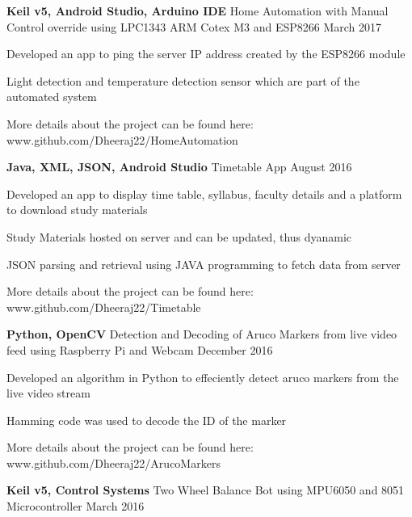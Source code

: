 \begin{cventries}
  \cventry
    {\textbf{Keil v5, Android Studio, Arduino IDE}}
    {Home Automation with Manual Control override using LPC1343 ARM Cotex M3 and ESP8266}
   {}
    {March 2017}
    {
      \begin{cvitems}
        \item {Developed an app to ping the server IP address created by the ESP8266 module}
         \item {Light detection and temperature detection sensor which are part of the automated system}
         \item {More details about the project can be found here: \textcolor{awesome-emerald}{www.github.com/Dheeraj22/HomeAutomation}}
      \end{cvitems}
    }
     \cventry
    {\textbf{Java, XML, JSON, Android Studio}}
    {Timetable App}
    {}
    {August 2016}
    {
      \begin{cvitems}
        \item {Developed an app to display time table, syllabus, faculty details and a platform to download study materials}
         \item {Study Materials hosted on server and can be updated, thus dyanamic}
         \item {JSON parsing and retrieval using JAVA programming to fetch data from server}
         \item {More details about the project can be found here: \textcolor{awesome-emerald}{www.github.com/Dheeraj22/Timetable}}
      \end{cvitems}
    }
    \cventry
    {\textbf{Python, OpenCV}}
    {Detection and Decoding of Aruco Markers from live video feed using Raspberry Pi and Webcam}
    {}
    {December 2016}
    {
      \begin{cvitems}
        \item {Developed an algorithm in Python to effeciently detect aruco markers from the live video stream}
         \item {Hamming code was used to decode the ID of the marker}
         \item {More details about the project can be found here: \textcolor{awesome-emerald}{www.github.com/Dheeraj22/ArucoMarkers}}
      \end{cvitems}
    }
     \cventry
    {\textbf{Keil v5, Control Systems}}
    {Two Wheel Balance Bot using MPU6050 and 8051 Microcontroller}
    {}
    {March 2016}
    {
      \begin{cvitems}

\end{cvitems}}
\end{cventries}
